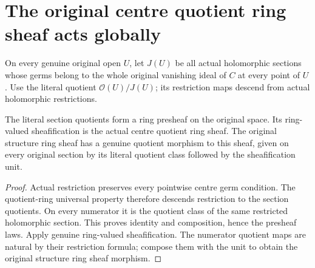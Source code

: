 \section{The original centre quotient ring sheaf acts globally}

On every genuine original open $U$, let $J(U)$ be all actual holomorphic
sections whose germs belong to the whole original vanishing ideal of $C$
at every point of $U$. Use the literal quotient $\mathcal O(U)/J(U)$;
its restriction maps descend from actual holomorphic restrictions.

\begin{definition}
\label{hir:real-domain-actual-centre-quotient-ring-sheaf}
\leanok
The literal section quotients form a ring presheaf on the original
space. Its ring-valued sheafification is the actual centre quotient ring
sheaf. The original structure ring sheaf has a genuine quotient morphism
to this sheaf, given on every original section by its literal quotient
class followed by the sheafification unit.
\end{definition}
\begin{proof}
Actual restriction preserves every pointwise centre germ condition.
The quotient-ring universal property therefore descends restriction to
the section quotients. On every numerator it is the quotient class of
the same restricted holomorphic section. This proves identity and
composition, hence the presheaf laws. Apply genuine ring-valued
sheafification. The numerator quotient maps are natural by their
restriction formula; compose them with the unit to obtain the original
structure ring sheaf morphism.
\end{proof}

